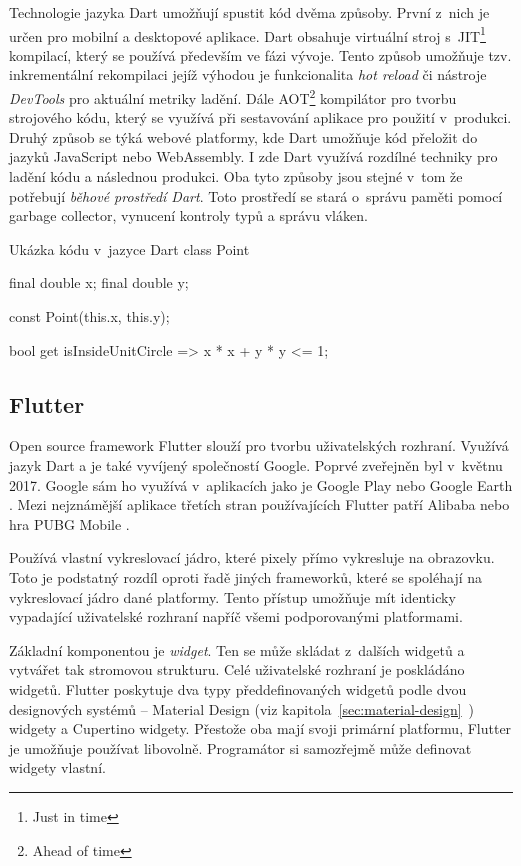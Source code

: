 \documentclass[
  biblatex,
  figures=true,
  tables=false,
  glossaries,
  index
]{kidiplom}
\begin{document}
Technologie jazyka Dart umožňují spustit kód dvěma způsoby. První z~nich je určen pro mobilní a desktopové aplikace. Dart obsahuje virtuální stroj s~JIT\footnote{Just in time} kompilací, který se používá především ve fázi vývoje. Tento způsob umožňuje tzv. inkrementální rekompilaci jejíž výhodou je funkcionalita \textit{hot reload} či nástroje \textit{DevTools} pro aktuální metriky ladění. Dále AOT\footnote{Ahead of time} kompilátor pro tvorbu strojového kódu, který se využívá při sestavování aplikace pro použití v~produkci. Druhý způsob se týká webové platformy, kde Dart umožňuje kód přeložit do jazyků JavaScript nebo WebAssembly. I zde Dart využívá rozdílné techniky pro ladění kódu a následnou produkci. Oba tyto způsoby jsou stejné v~tom že potřebují \textit{běhové prostředí Dart}. Toto prostředí se stará o~správu paměti pomocí garbage collector, vynucení kontroly typů a správu vláken.

\begin{kicode}{}{}{Ukázka kódu v~jazyce Dart}
class Point {
  final double x;
  final double y;

  const Point(this.x, this.y);

  bool get isInsideUnitCircle => x * x + y * y <= 1;
}
\end{kicode}

\subsection{Flutter}
Open source framework Flutter \cite{flutter} slouží pro tvorbu uživatelských rozhraní. Využívá jazyk Dart a je také vyvíjený společností Google. Poprvé zveřejněn byl v~květnu 2017. Google sám ho využívá v~aplikacích jako je Google Play nebo Google Earth \cite{flutter-showcase}. Mezi nejznámější aplikace třetích stran používajících Flutter patří Alibaba nebo hra PUBG Mobile \cite{flutter-showcase}.

Používá vlastní vykreslovací jádro, které pixely přímo vykresluje na obrazovku. Toto je podstatný rozdíl oproti řadě jiných frameworků, které se spoléhají na vykreslovací jádro dané platformy. Tento přístup umožňuje mít identicky vypadající uživatelské rozhraní napříč všemi podporovanými platformami.

Základní komponentou je \textit{widget}. Ten se může skládat z~dalších widgetů a vytvářet tak stromovou strukturu. Celé uživatelské rozhraní je poskládáno widgetů. Flutter poskytuje dva typy předdefinovaných widgetů podle dvou designových systémů -- Material Design (viz kapitola~\ref{sec:material-design}~) widgety a Cupertino widgety. Přestože oba mají svoji primární platformu, Flutter je umožňuje používat libovolně. Programátor si samozřejmě může definovat widgety vlastní.
\end{document}
